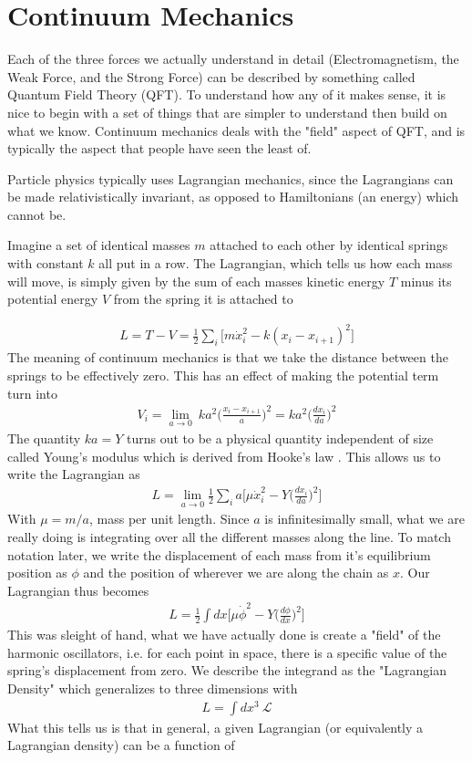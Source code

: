 \section{Continuum Mechanics}
Each of the three forces we actually understand in detail (Electromagnetism, the Weak Force, and the Strong Force) can be described by something called Quantum Field Theory (QFT). To understand how any of it makes sense, it is nice to begin with a set of things that are simpler to understand then build on what we know. Continuum mechanics deals with the "field" aspect of QFT, and is typically the aspect that people have seen the least of. 

Particle physics typically uses Lagrangian mechanics, since the Lagrangians can be made relativistically invariant, as opposed to  Hamiltonians (an energy) which cannot be.

Imagine a set of identical masses $m$ attached to each other by identical springs with constant $k$ all put in a row. The Lagrangian, which tells us how each mass will move, is simply given by the sum of each masses kinetic energy $T$ minus its potential energy $V$ from the spring it is attached to

\begin{align}
    L = T - V = \frac{1}{2}\sum_i \Big[m \dot{x}_i^2 - k(x_i - x_{i+1})^2\Big]
\end{align}
The meaning of continuum mechanics is that we take the distance between the springs to be effectively zero. This has an effect of making the potential term turn into
\begin{align}
    V_i =\lim_{a\to 0} ~k a^2 \Big(\frac{x_i - x_{i+1}}{a}\Big)^2 = ka^2 \Big(\frac{d x_i}{d a}\Big)^2
\end{align}
The quantity $ka = Y$ turns out to be a physical quantity independent of size called Young's modulus which is derived from Hooke's law \cite{goldstein}. This allows us to write the Lagrangian as 
\begin{align}
    L = \lim_{a\to 0} \frac{1}{2}\sum_i a\Big[\mu \dot{x}_i^2 - Y\Big(\frac{d x_i}{d a}\Big)^2\Big]
\end{align}
With $\mu = m/a$, mass per unit length. Since $a$ is infinitesimally small, what we are really doing is integrating over all the different masses along the line. To match notation later, we write the displacement of each mass from it's equilibrium position as $\phi$ and the position of wherever we are along the chain as $x$. Our Lagrangian thus becomes
\begin{align}
    L = \frac{1}{2}\int dx \Big[\mu \dot{\phi}^2 - Y\Big(\frac{d\phi}{d x}\Big)^2\Big]
\end{align}
This was sleight of hand, what we have actually done is create a "field" of the harmonic oscillators, i.e. for each point in space, there is a specific value of the spring's displacement from zero. We describe the integrand as the "Lagrangian Density" which generalizes to three dimensions with
\begin{align}
    L = \int dx^3 ~\mathcal{L}
\end{align}
What this tells us is that in general, a given Lagrangian (or equivalently a Lagrangian density) can be a function of

